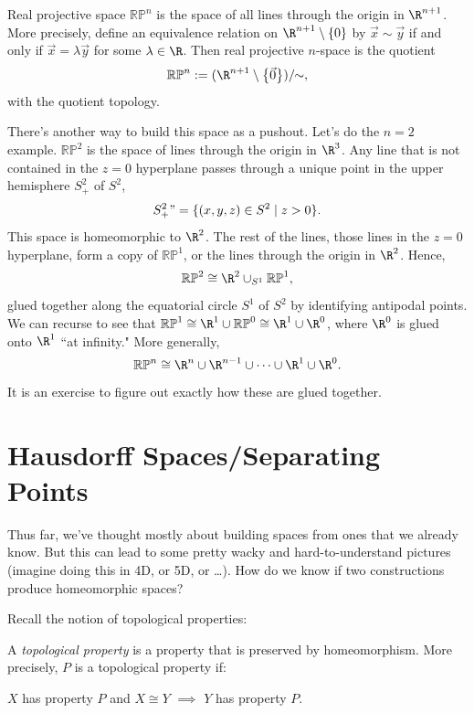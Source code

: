 \documentclass[noname]{notes}
\newcommand{\RP}{\mathbb{RP}}
\begin{document}
\begin{example}
	Real projective space $\RP^n$ is the space of all lines through the origin in $\R^{n+1}$. More precisely, define an equivalence relation on $\R^{n+1} \setminus \{0\}$ by $\vec{x} \sim \vec{y}$ if and only if $\vec{x} = \lambda \vec{y}$ for some $\lambda \in \R$. Then real projective $n$-space is the quotient
	\[
		\RP^n := (\R^{n+1} \setminus \big\{\vec{0}\big\})/\!\!\sim,
	\]
	with the quotient topology. 
	
	There's another way to build this space as a pushout. Let's do the $n = 2$ example. $\RP^2$ is the space of lines through the origin in $\R^3$. Any line that is not contained in the $z = 0$ hyperplane passes through a unique point in the upper hemisphere $S^2_+$ of $S^2$, 
	\[
		S^2_+ "= \{(x,y,z) \in S^2 \mid z > 0\}. 
	\]
	This space is homeomorphic to $\R^2$. The rest of the lines, those lines in the $z = 0$ hyperplane, form a copy of $\RP^1$, or the lines through the origin in $\R^2$. Hence, 
	\[
		\RP^2 \cong \R^2 \cup_{S^1} \RP^1,
	\]
	glued together along the equatorial circle $S^1$ of $S^2$ by identifying antipodal points. We can recurse to see that $\RP^1 \cong \R^1 \cup \RP^0 \cong \R^1 \cup \R^0$, where $\R^0$ is glued onto $\R^1$ ``at infinity." More generally, 
	\[
		\RP^n \cong \R^n \cup \R^{n-1} \cup \cdots \cup \R^1 \cup \R^0. 
	\]
	It is an exercise to figure out exactly how these are glued together. 
\end{example}


\section{Hausdorff Spaces/Separating Points}

Thus far, we've thought mostly about building spaces from ones that we already know. But this can lead to some pretty wacky and hard-to-understand pictures (imagine doing this in 4D, or 5D, or \ldots). How do we know if two constructions produce homeomorphic spaces? 

Recall the notion of topological properties: 

\begin{definition}
	A \emph{topological property} is a property that is preserved by homeomorphism. More precisely, $P$ is a topological property if:
	\begin{center}
		$X$ has property $P$ and $X \cong Y$ $\implies$ $Y$ has property $P$.
	\end{center}
\end{definition}
\end{document}
